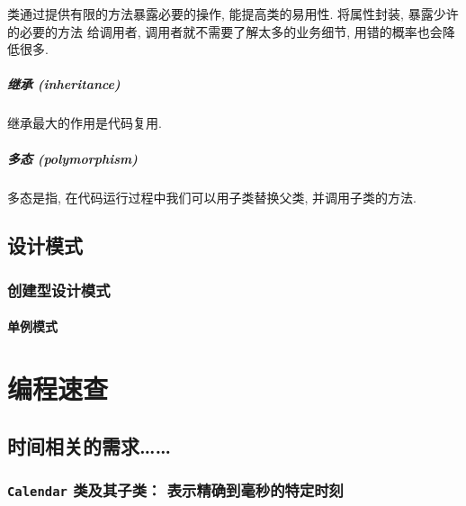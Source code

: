 \documentclass[10pt,UTF8]{book} %
\begin{document}
类通过提供有限的方法暴露必要的操作, 能提高类的易用性. 将属性封装, 暴露少许的必要的方法
给调用者, 调用者就不需要了解太多的业务细节, 用错的概率也会降低很多.

\subsubsection{继承 (inheritance)}

继承最大的作用是代码复用.

\subsubsection{多态 (polymorphism)}

多态是指, 在代码运行过程中我们可以用子类替换父类, 并调用子类的方法.

\newpage
\thispagestyle{empty}

\chapter{设计模式}

\section{创建型设计模式}

\subsection{单例模式}

%     
\part{编程速查}

\chapter{时间相关的需求……}

\section{\lstinline|Calendar| 类及其子类： 表示精确到毫秒的特定时刻}
\end{document}
